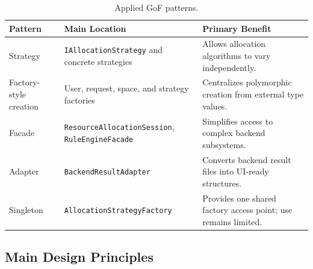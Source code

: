 \documentclass[12pt,a4paper]{article}
\begin{document}
\begin{table}[H]
    \centering
    \small
    \caption{Applied GoF patterns.}
    \begin{tabularx}{\textwidth}{L{3.2cm}L{5cm}Y}
        \toprule
        \textbf{Pattern}
        & \textbf{Main Location}
        & \textbf{Primary Benefit} \\
        \midrule

        Strategy
        & \texttt{IAllocationStrategy} and concrete strategies
        & Allows allocation algorithms to vary independently. \\

        Factory-style creation
        & User, request, space, and strategy factories
        & Centralizes polymorphic creation from external type values. \\

        Facade
        & \texttt{ResourceAllocationSession},
        \texttt{RuleEngineFacade}
        & Simplifies access to complex backend subsystems. \\

        Adapter
        & \texttt{BackendResultAdapter}
        & Converts backend result files into UI-ready structures. \\

        Singleton
        & \texttt{AllocationStrategyFactory}
        & Provides one shared factory access point; use remains limited. \\

        \bottomrule
    \end{tabularx}
\end{table}

\subsection{Main Design Principles}
\end{document}
